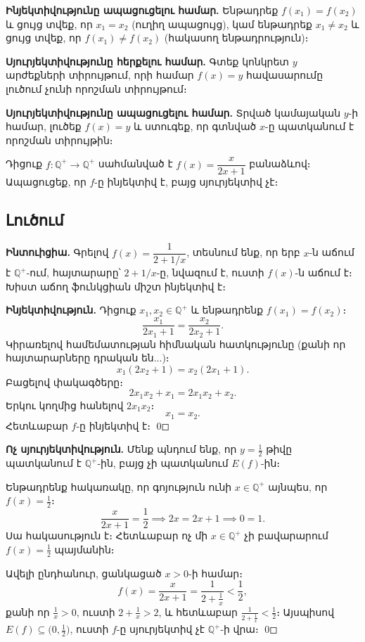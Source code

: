 \documentclass[12pt, a4paper]{article}
\newcommand{\Q}{\mathbb{Q}}
\begin{document}
\begin{theorybox}
\textbf{Ինյեկտիվությունը ապացուցելու համար.}\;
Ենթադրեք $f(x_1) = f(x_2)$ և ցույց տվեք, որ $x_1 = x_2$ (ուղիղ ապացույց),
կամ ենթադրեք $x_1 \neq x_2$ և ցույց տվեք, որ $f(x_1) \neq f(x_2)$ (հակասող ենթադրություն)։

\textbf{Սյուրյեկտիվությունը հերքելու համար.}\;
Գտեք կոնկրետ $y$ արժեքների տիրույթում, որի համար $f(x) = y$ հավասարումը լուծում չունի որոշման տիրույթում։

\textbf{Սյուրյեկտիվությունը ապացուցելու համար.}\;
Տրված կամայական $y$-ի համար, լուծեք $f(x) = y$ և ստուգեք, որ գտնված $x$-ը պատկանում է որոշման տիրույթին։
\end{theorybox}

\begin{problembox}
Դիցուք $f : \Q^+ \to \Q^+$ սահմանված է $f(x) = \dfrac{x}{2x+1}$ բանաձևով։
Ապացուցեք, որ $f$-ը ինյեկտիվ է, բայց սյուրյեկտիվ չէ։
\end{problembox}

\subsection*{Լուծում}

\textbf{Ինտուիցիա.}\; Գրելով $f(x) = \dfrac{1}{2 + 1/x}$, տեսնում ենք, որ երբ $x$-ն աճում է $\mathbb{Q}^+$-ում, հայտարարը՝ $2 + 1/x$-ը, նվազում է, ուստի $f(x)$-ն աճում է։ Խիստ աճող ֆունկցիան միշտ ինյեկտիվ է։

\medskip

\textbf{Ինյեկտիվություն.}\;
Դիցուք $x_1, x_2 \in \Q^+$ և ենթադրենք $f(x_1) = f(x_2)$։
\[
  \frac{x_1}{2x_1 + 1} = \frac{x_2}{2x_2 + 1}.
\]
Կիրառելով համեմատության հիմնական հատկությունը (քանի որ հայտարարները դրական են...)։
\[
  x_1(2x_2 + 1) = x_2(2x_1 + 1).
\]
Բացելով փակագծերը։
\[
  2x_1 x_2 + x_1 = 2x_1 x_2 + x_2.
\]
Երկու կողմից հանելով $2x_1 x_2$։
\[
  x_1 = x_2.
\]
Հետևաբար $f$-ը ինյեկտիվ է։ \qed

\bigskip
\textbf{Ոչ սյուրյեկտիվություն.}\;
Մենք պնդում ենք, որ $y = \frac{1}{2}$ թիվը պատկանում է $\Q^+$-ին, բայց չի պատկանում $E(f)$-ին։

Ենթադրենք հակառակը, որ գոյություն ունի $x \in \Q^+$ այնպես, որ $f(x) = \frac{1}{2}$։
\[
  \frac{x}{2x+1} = \frac{1}{2} \implies 2x = 2x + 1 \implies 0 = 1.
\]
Սա հակասություն է։ Հետևաբար ոչ մի $x \in \Q^+$ չի բավարարում $f(x) = \frac{1}{2}$ պայմանին։

\medskip
Ավելի ընդհանուր, ցանկացած $x > 0$-ի համար։
\[
  f(x) = \frac{x}{2x+1} = \frac{1}{2 + \frac{1}{x}} < \frac{1}{2},
\]
քանի որ $\frac{1}{x} > 0$, ուստի $2 + \frac{1}{x} > 2$, և հետևաբար $\frac{1}{2+\frac{1}{x}} < \frac{1}{2}$։
Այսպիսով $E(f) \subseteq \bigl(0, \frac{1}{2}\bigr)$, ուստի $f$-ը սյուրյեկտիվ չէ $\Q^+$-ի վրա։ \qed
\end{document}
